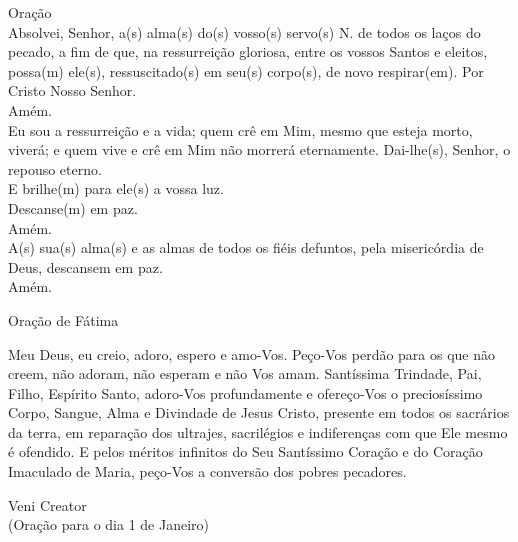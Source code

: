 \begin{flushleft}
    Oração
    \vspace{.2cm} \\
    Absolvei, Senhor, a(s) alma(s) do(s) vosso(s) servo(s) \textcolor{VioletRed3}{N.} de todos os laços do pecado, a fim de que, na ressurreição gloriosa, entre os vossos Santos e eleitos, possa(m) ele(s), ressuscitado(s) em seu(s) corpo(s), de novo respirar(em). Por Cristo Nosso Senhor. \\
    \RbarRed{} Amém.
    \vspace{.2cm} \\
    \VbarRed{} Eu sou a ressurreição e a vida; quem crê em Mim, mesmo que esteja morto, viverá; e quem vive e crê em Mim não morrerá eternamente. Dai-lhe(s), Senhor, o repouso eterno. \\
    \RbarRed{} E brilhe(m) para ele(s) a vossa luz.
    \vspace{.2cm} \\
    \VbarRed{} Descanse(m) em paz. \\
    \RbarRed{} Amém.
    \vspace{.2cm} \\
    \VbarRed{} A(s) sua(s) alma(s) e as almas de todos os fiéis defuntos, pela misericórdia de Deus, descansem em paz. \\
    \RbarRed{} Amém.
\end{flushleft}
\begin{center}
    Oração de Fátima
\end{center}
\begin{flushleft}
    Meu Deus, eu creio, adoro, espero e amo-Vos. Peço-Vos perdão para os que não creem, não adoram, não esperam e não Vos amam. Santíssima Trindade, Pai, Filho, Espírito Santo, adoro-Vos profundamente e ofereço-Vos o preciosíssimo Corpo, Sangue, Alma e Divindade de Jesus Cristo, presente em todos os sacrários da terra, em reparação dos ultrajes, sacrilégios e indiferenças com que Ele mesmo é ofendido. E pelos méritos infinitos do Seu Santíssimo Coração e do Coração Imaculado de Maria, peço-Vos a conversão dos pobres pecadores.
\end{flushleft}
\begin{center}
    Veni Creator \\ \textcolor{VioletRed3}{\scriptsize{(Oração para o dia 1 de Janeiro)}}
\end{center}
